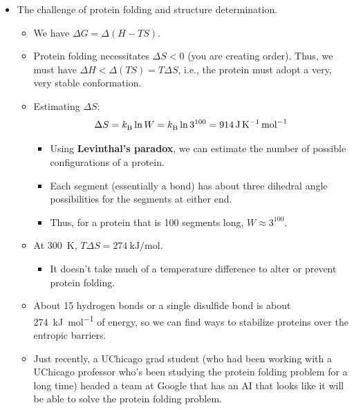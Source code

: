 \documentclass[../notes.tex]{subfiles}
\begin{document}
\begin{itemize}
\begin{itemize}
        \item To achieve temperatures lower than \SI{4}{\kelvin}, you stick copper salt in a cryostat, subject it to a magnetic field, and cool it to \SI{4}{\kelvin} with the above method. The magnet aligns the spins. When you take the salt out of the magnetic field, the spins will randomize entropically, but this takes energy. You use the lattice energy to raise the spin energy.
    \end{itemize}
    \item The challenge of protein folding and structure determination.
    \begin{itemize}
        \item We have $\Delta G=\Delta(H-TS)$.
        \item Protein folding necessitates $\Delta S<0$ (you are creating order). Thus, we must have $\Delta H<\Delta(TS)=T\Delta S$, i.e., the protein must adopt a very, very stable conformation.
        \item Estimating $\Delta S$:
        \begin{equation*}
            \Delta S = {k_\text{B}^{}}\ln W
            = {k_\text{B}^{}}\ln 3^{100}
            = \SI{914}{\joule\per\kelvin\per\mole}
        \end{equation*}
        \begin{itemize}
            \item Using \textbf{Levinthal's paradox}, we can estimate the number of possible configurations of a protein.
            \item Each segment (essentially a  bond) has about three dihedral angle possibilities for the segments at either end.
            \item Thus, for a protein that is 100 segments long, $W\approx 3^{100}$.
        \end{itemize}
        \item At \SI{300}{\kelvin}, $T\Delta S=\SI[per-mode=symbol]{274}{\kilo\joule\per\mole}$.
        \begin{itemize}
            \item It doesn't take much of a temperature difference to alter or prevent protein folding.
        \end{itemize}
        \item About 15 hydrogen bonds or a single disulfide bond is about \SI[per-mode=symbol]{274}{\kilo\joule\per\mole} of energy, so we can find ways to stabilize proteins over the entropic barriers.
        \item Just recently, a UChicago grad student (who had been working with a UChicago professor who's been studying the protein folding problem for a long time) headed a team at Google that has an AI that looks like it will be able to solve the protein folding problem.

\end{itemize}
\end{itemize}
\end{document}
